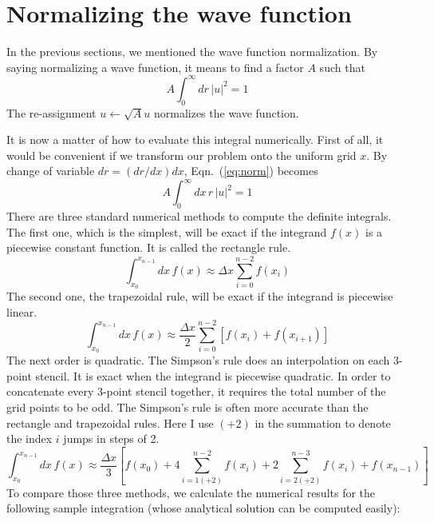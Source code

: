 \section{Normalizing the wave function}
In the previous sections, we mentioned the wave function normalization. By saying
normalizing a wave function, it means to find a factor $A$ such that
\begin{equation} \label{eq:norm}
A \int_0^\infty dr\,|u|^2 = 1
\end{equation}
The re-assignment $u \gets \sqrt{A}u$ normalizes the wave function.

It is now a matter of how to evaluate this integral numerically. First of all,
it would be convenient if we transform our problem onto the uniform grid $x$.
By change of variable $dr = (dr/dx)dx$, Eqn.~(\ref{eq:norm}) becomes
\begin{equation} \label{eq:normt}
A \int_0^\infty dx\,r\,|u|^2 = 1
\end{equation}
%
There are three standard numerical methods to compute the definite integrals.
The first one, which is the simplest, will be exact if the integrand $f(x)$ is
a piecewise constant function. It is called the rectangle rule.
\begin{equation} \label{eq:rect}
\int_{x_0}^{x_{n-1}} dx\,f(x) \approx \Delta x \sum_{i=0}^{n-2}{f(x_i)}
\end{equation}
%
The second one, the trapezoidal rule, will be exact if the integrand
is piecewise linear.
\begin{equation} \label{eq:tpzd}
\int_{x_0}^{x_{n-1}} dx\,f(x) \approx \frac{\Delta x}{2} \sum_{i=0}^{n-2}{\left[f(x_i) + f(x_{i+1})\right]}
\end{equation}
%
The next order is quadratic. The Simpson's rule does an interpolation on each
3-point stencil. It is exact when the integrand is piecewise quadratic.
In order to concatenate every 3-point stencil together,
it requires the total number of the grid points to be odd.
The Simpson's rule is often more accurate than the rectangle and
trapezoidal rules. Here I use $(+2)$ in the summation to denote the index $i$ jumps
in steps of 2.
\begin{equation} \label{eq:simp}
\int_{x_0}^{x_{n-1}} dx\,f(x) \approx \frac{\Delta x}{3} \left[f(x_0) + 4\sum_{i=1(+2)}^{n-2}{f(x_i)} + 2\sum_{i=2(+2)}^{n-3}{f(x_i)} + f(x_{n-1})\right]
\end{equation}
%
To compare those three methods, we calculate the numerical results
for the following sample integration (whose analytical solution can be computed easily):
